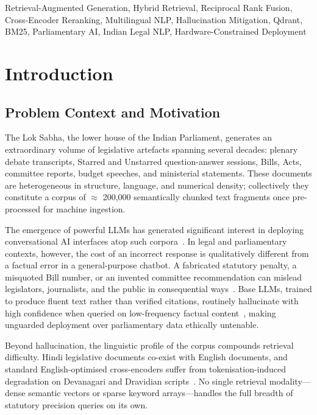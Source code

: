\documentclass[conference]{IEEEtran}
\begin{document}
\begin{IEEEkeywords}
Retrieval-Augmented Generation, Hybrid Retrieval, Reciprocal Rank Fusion,
Cross-Encoder Reranking, Multilingual NLP, Hallucination Mitigation, Qdrant,
BM25, Parliamentary AI, Indian Legal NLP, Hardware-Constrained Deployment
\end{IEEEkeywords}

\section{Introduction}
\label{sec:intro}

\subsection{Problem Context and Motivation}

The Lok Sabha, the lower house of the Indian Parliament, generates an
extraordinary volume of legislative artefacts spanning several decades:
plenary debate transcripts, Starred and Unstarred question-answer sessions,
Bills, Acts, committee reports, budget speeches, and ministerial statements.
These documents are heterogeneous in structure, language, and numerical
density; collectively they constitute a corpus of $\approx$ 200,000 semantically
chunked text fragments once pre-processed for machine ingestion.

The emergence of powerful LLMs has generated significant interest in deploying
conversational AI interfaces atop such corpora~\cite{lewis2020rag}.
In legal and parliamentary contexts, however, the cost of an incorrect
response is qualitatively different from a factual error in a general-purpose
chatbot.
A fabricated statutory penalty, a misquoted Bill number, or an invented
committee recommendation can mislead legislators, journalists, and the public
in consequential ways~\cite{rag_framework2025,kemenkeu2024}.
Base LLMs, trained to produce fluent text rather than verified citations,
routinely hallucinate with high confidence when queried on low-frequency
factual content~\cite{lewis2020rag}, making unguarded deployment over
parliamentary data ethically untenable.

Beyond hallucination, the linguistic profile of the corpus compounds
retrieval difficulty.
Hindi legislative documents co-exist with English documents, and standard
English-optimised cross-encoders suffer from tokenisation-induced degradation
on Devanagari and Dravidian scripts~\cite{multilingualrag_2025,mrag_settings2024}.
No single retrieval modality---dense semantic vectors or sparse keyword
arrays---handles the full breadth of statutory precision queries on its own.
\end{document}
